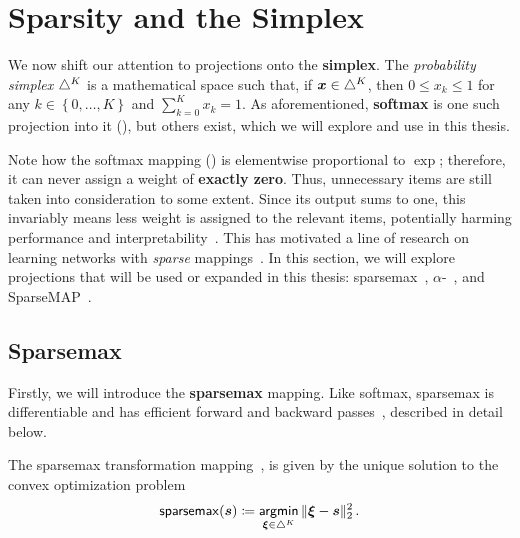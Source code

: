 \section{Sparsity and the Simplex}
\label{sec:sparsity_background}


\noindent We now shift our attention to projections onto the \textbf{simplex}. The
\textit{probability simplex} $\triangle^K$ is a mathematical space
such that, if $\bm{x}\in\triangle^K$, then $0 \leq x_k \leq 1$ for any
$k\in\left\{0, \dots, K\right\}$ and $\sum_{k=0}^K x_k = 1$. As
aforementioned, \textbf{softmax} is one such projection into it
(), but others exist, which we will explore and use in this thesis.

Note how the softmax mapping () is elementwise
proportional to $\exp$; therefore, it can never assign a weight of
\textbf{exactly zero}. Thus, unnecessary items are still taken into
consideration to some extent. Since its output sums to one, this
invariably means less weight is assigned to the relevant items,
potentially harming performance and
interpretability~\citep{jain2019attention}. This has motivated a line
of research on learning networks with \emph{sparse}
mappings~\citep{sparsemax,fusedmax,louizos,shao2019ssn}. In this
section, we will explore projections that will be used or expanded in
this thesis: sparsemax~\citep{martins2016softmax},
$\alpha$-\entmaxtext~\citep{blondel2019learning,entmax}, and
SparseMAP~\cite{niculae2018sparsemap}.

\subsection{Sparsemax}\label{sec:sparsemax_bg}

\noindent Firstly, we will introduce the \textbf{sparsemax} mapping.
Like softmax, sparsemax is differentiable and has efficient forward and backward
passes~\citep{Held1974,martins2016softmax}, described in detail below.

\begin{definition}[sparsemax]
    The sparsemax transformation
    mapping~\citep{martins2016softmax}, is given by the unique solution
    to the convex optimization problem
    \begin{equation}\label{eq:sparsemax}
        \operatorname*{\mathsf{sparsemax}}(\bm{s}) \coloneqq \operatorname*{\mathsf{argmin}}_{\bm{\xi} \in \triangle^K} \| \bm{\xi} - \bm{s} \|_2^2\,.
    \end{equation}
\end{definition}


